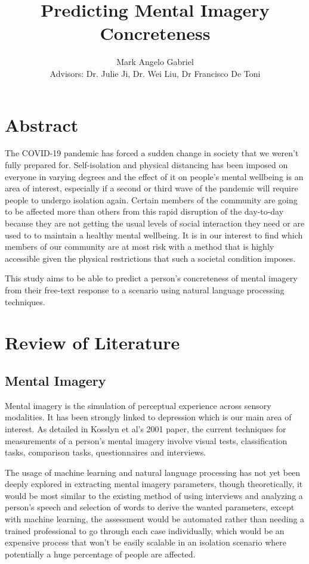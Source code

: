 \documentclass[12pt, a4paper]{article}
\title{Predicting Mental Imagery Concreteness}
\author{Mark Angelo Gabriel\\[0.5cm]{\small Advisors: Dr. Julie Ji, Dr. Wei Liu, Dr Francisco De Toni}}
\date{}
\begin{document}
\maketitle

\tableofcontents
\listoffigures
\listoftables


\section{Abstract} The COVID-19 pandemic has forced a sudden change in society that we weren't fully prepared for.  Self-isolation and physical distancing has been imposed on everyone in varying degrees and the effect of it on people's mental wellbeing is an area of interest, especially if a second or third wave of the pandemic will require people to undergo isolation again. Certain members of the community are going to be affected more than others from this rapid disruption of the day-to-day because they are not getting the usual levels of social interaction they need or are used to to maintain a healthy mental wellbeing. It is in our interest to find which members of our community are at most risk with a method that is highly accessible given the physical restrictions that such a societal condition imposes. 

This study aims to be able to predict a person's concreteness of mental imagery from their free-text response to a scenario using natural language processing techniques. 

\section{Review of Literature}

\subsection{Mental Imagery}
Mental imagery is the simulation of perceptual experience \cite{Kosslyn2001} across sensory modalities. It has been strongly linked to depression \cite{Patel2005} which is our main area of interest. As detailed in Kosslyn et al's 2001 paper, the current techniques for measurements of a person's mental imagery involve visual tests, classification tasks, comparison tasks, questionnaires and interviews. 

The usage of machine learning and natural language processing has not yet been deeply explored in extracting mental imagery parameters, though theoretically, it would be most similar to the existing method of using interviews and analyzing a person's speech and selection of words to derive the wanted parameters, except with machine learning, the assessment would be automated rather than needing a trained professional to go through each case individually, which would be an expensive process that won't be easily scalable in an isolation scenario where potentially a huge percentage of people are affected.
\end{document}
